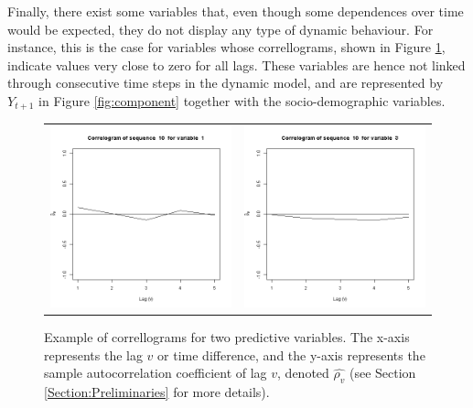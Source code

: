 Finally, there exist some variables that, even though some dependences over time would be expected, they do not display any type of dynamic behaviour. For instance, this is the case for variables whose correllograms, shown in Figure \ref{fig:cajamarCorr}, indicate values very close to zero for all lags. These variables are hence not linked through consecutive time steps in the dynamic model, and are represented by $Y_{t+1}$ in Figure \ref{fig:component} together with the socio-demographic variables.

\begin{figure}[h]
  \centering
    \begin{tabular}{cc}
    \includegraphics[width=70mm]{figures/CajaMarcrl1}&
     \includegraphics[width=70mm]{figures/CajaMarcrl3}\\
  \end{tabular}
    \caption{\label{fig:cajamarCorr}Example of correllograms for two predictive variables.  The x-axis represents the lag $v$ or time difference, and the y-axis represents the sample autocorrelation coefficient of lag $v$, denoted $\hat{\rho_v}$ (see Section \ref{Section:Preliminaries} for more details).}
\end{figure}


